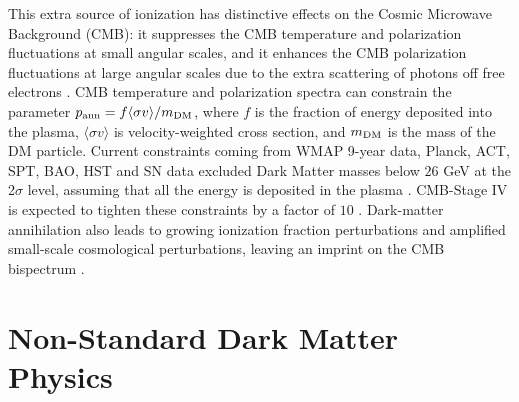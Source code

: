 This extra source of ionization has distinctive effects on the Cosmic Microwave Background (CMB): it suppresses the CMB temperature and polarization fluctuations at small angular scales, and it enhances the CMB polarization fluctuations at large angular scales due to the extra scattering of photons off free electrons \cite{Chen:2003gz,Padmanabhan:2005es}.
CMB temperature and polarization spectra can constrain the parameter
$p_{\rm ann}=f\langle\sigma v\rangle/m_{\rm DM}$, where $f$ is the fraction of energy
deposited into the plasma, $\langle\sigma v\rangle$ is velocity-weighted
cross section, and $m_{\rm DM}$ is the mass of the DM particle.
Current constraints coming from WMAP 9-year data,
Planck, ACT, SPT, BAO, HST and SN data excluded
Dark Matter masses below $26$ GeV at the 2$\sigma$ level, assuming that
all the energy is deposited in the plasma \cite{Madhavacheril:2013cna}. CMB-Stage IV is expected to tighten these constraints by a factor of $10$ \cite{Wu:2014hta}. Dark-matter annihilation also leads to growing ionization fraction perturbations and amplified small-scale cosmological perturbations, leaving an imprint on the CMB bispectrum \cite{Dvorkin:2013cga}.

\section{Non-Standard Dark Matter Physics}

